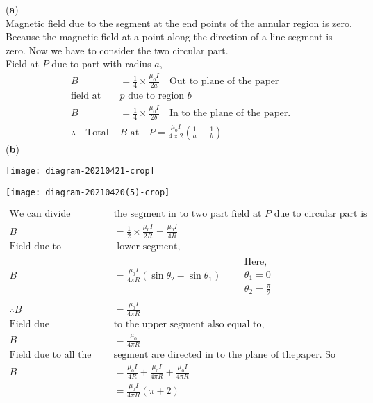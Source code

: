 \begin{answer}
	\vspace{0.2cm}
	(\textbf{a})\\
	Magnetic field due to the segment at the end points of the annular region is zero. Because the magnetic field at  a point along the direction of a line segment is zero. Now we have to consider the two circular part.\\
  Field at $P$ due to part with radius $a$,
 \begin{align*}
 B&=\frac{1}{4}\times \frac{\mu_0 I}{2a}\quad \text{Out to plane of the paper}\\
 \text{field at }&\text{$p$ due to region $b$}\\
 B&=\frac{1}{4}\times \frac{\mu_0 I}{2b}\quad \text{In to the plane of the paper.}\\
 \therefore \quad\text{Total } &B\text{ at}\quad P =\frac{\mu_0 I}{4\times2}(\frac{1}{a}-\frac{1}{b})
 \end{align*}
	(\textbf{b})\\
	\begin{center}
		\begin{minipage}{0.45\textwidth}\hfill
			\centering
			\texttt{[image: diagram-20210421-crop]}
		\end{minipage}
		\begin{minipage}{0.45\textwidth}
			\centering
			\texttt{[image: diagram-20210420(5)-crop]}
		\end{minipage}
	\end{center}
	\begin{align*}
	\text{We can divide }&\text{the segment in to two part field at $P$ due to circular part is}\\
 B&=\frac{1}{2}\times \frac{\mu_0 I}{2R}=\frac{\mu_0 I}{4 R} \\
 \text{Field due to}&\text{ lower segment,}\\
B&=\frac{\mu_0 I}{4 \pi R}(\sin \theta_2-\sin \theta_1)  \qquad\begin{array}{l}
\text{Here,}\\\theta_1=0 \\
\theta_2=\frac{\pi}{2} 
\end{array}\\
\therefore B&=\frac{\mu_0 I}{4 \pi R}\\
\text{Field due }&\text{to the upper segment also equal to,}\\
B&=\frac{\mu_0}{4 \pi R}\\
\text{Field due to all the three }&\text{segment are directed in to the plane of thepaper. So}\\
B&=\frac{\mu_0 I}{4 R}+\frac{\mu_0 I}{4 \pi R}+\frac{\mu_0 I}{4 \pi R}\\
&=\frac{\mu_0 I}{4\pi R}(\pi+2)
\end{align*}
\end{answer}
